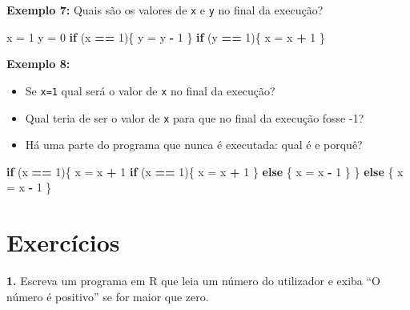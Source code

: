 \documentclass[
]{book}
\newenvironment{Shaded}{\begin{snugshade}}{\end{snugshade}}
\newcommand{\ControlFlowTok}[1]{\textcolor[rgb]{0.13,0.29,0.53}{\textbf{#1}}}
\newcommand{\DecValTok}[1]{\textcolor[rgb]{0.00,0.00,0.81}{#1}}
\newcommand{\NormalTok}[1]{#1}
\newcommand{\OtherTok}[1]{\textcolor[rgb]{0.56,0.35,0.01}{#1}}
\newcommand{\SpecialCharTok}[1]{\textcolor[rgb]{0.81,0.36,0.00}{\textbf{#1}}}
\begin{document}
\textbf{Exemplo 7:} Quais são os valores de \texttt{x} e \texttt{y} no final da execução?

\begin{Shaded}
\begin{Highlighting}[]
\NormalTok{x }\OtherTok{=} \DecValTok{1}
\NormalTok{y }\OtherTok{=} \DecValTok{0}
\ControlFlowTok{if}\NormalTok{ (x }\SpecialCharTok{==} \DecValTok{1}\NormalTok{)\{  }
\NormalTok{  y }\OtherTok{=}\NormalTok{ y }\SpecialCharTok{{-}} \DecValTok{1}
\NormalTok{\}}
\ControlFlowTok{if}\NormalTok{ (y }\SpecialCharTok{==} \DecValTok{1}\NormalTok{)\{  }
\NormalTok{  x }\OtherTok{=}\NormalTok{ x }\SpecialCharTok{+} \DecValTok{1}
\NormalTok{\}}
\end{Highlighting}
\end{Shaded}

\textbf{Exemplo 8:}

\begin{itemize}
\item
  Se \texttt{x=1} qual será o valor de \texttt{x} no final da execução?
\item
  Qual teria de ser o valor de \texttt{x} para que no final da execução fosse
  -1?
\item
  Há uma parte do programa que nunca é executada: qual é e porquê?
\end{itemize}

\begin{Shaded}
\begin{Highlighting}[]
\ControlFlowTok{if}\NormalTok{ (x }\SpecialCharTok{==} \DecValTok{1}\NormalTok{)\{  }
\NormalTok{  x }\OtherTok{=}\NormalTok{ x }\SpecialCharTok{+} \DecValTok{1}  
  \ControlFlowTok{if}\NormalTok{ (x }\SpecialCharTok{==} \DecValTok{1}\NormalTok{)\{    }
\NormalTok{    x }\OtherTok{=}\NormalTok{ x }\SpecialCharTok{+} \DecValTok{1}  
\NormalTok{  \} }\ControlFlowTok{else}\NormalTok{ \{   }
\NormalTok{      x }\OtherTok{=}\NormalTok{ x }\SpecialCharTok{{-}} \DecValTok{1}  
\NormalTok{  \}}
\NormalTok{\} }\ControlFlowTok{else}\NormalTok{ \{  }
\NormalTok{    x }\OtherTok{=}\NormalTok{ x }\SpecialCharTok{{-}} \DecValTok{1}
\NormalTok{\}}
\end{Highlighting}
\end{Shaded}

\section{Exercícios}\label{exercuxedcios-6}

\textbf{1.} Escreva um programa em R que leia um número do utilizador e exiba
``O número é positivo'' se for maior que zero.
\end{document}
